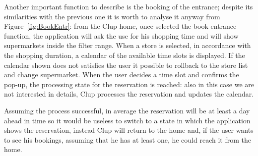 Another important function to describe is the booking of the entrance; despite its similarities with the previous one it is worth to analyse it anyway from Figure~\ref{fig:BookEntr}: from the Clup home, once selected the book entrance function, the application will ask the use for his shopping time and will show supermarkets inside the filter range. When a store is selected, in accordance with the shopping duration, a calendar of the available time slots is displayed. \newline 
If the calendar shown does not satisfies the user it possible to rollback to the store list and change supermarket. When the user decides a time slot and confirms the pop-up, the processing state for the reservation is reached: also in this case we are not interested in details, Clup processes the reservation and updates the calendar. \newline

Assuming the process successful, in average the reservation will be at least a day ahead in time so it would be useless to switch to a state in which the application shows the reservation, instead Clup will return to the home and, if the user wants to see his bookings, assuming that he has at least one, he could reach it from the home.  

